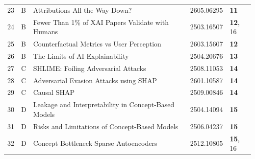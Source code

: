 \begin{longtable}{@{}clllp{\danhmucwch}@{}}
23 & B & Attributions All the Way Down? & 2605.06295 & \textbf{11} \\
24 & B & Fewer Than 1\% of XAI Papers Validate with Humans & 2503.16507 & \textbf{12}, 16 \\
25 & B & Counterfactual Metrics vs User Perception & 2603.15607 & \textbf{12} \\
26 & B & The Limits of AI Explainability & 2504.20676 & \textbf{13} \\
27 & C & SHLIME: Foiling Adversarial Attacks & 2508.11053 & \textbf{14} \\
28 & C & Adversarial Evasion Attacks using SHAP & 2601.10587 & \textbf{14} \\
29 & C & Causal SHAP & 2509.00846 & \textbf{14} \\
30 & D & Leakage and Interpretability in Concept-Based Models & 2504.14094 & \textbf{15} \\
31 & D & Risks and Limitations of Concept-Based Models & 2506.04237 & \textbf{15} \\
32 & D & Concept Bottleneck Sparse Autoencoders & 2512.10805 & \textbf{15}, 16 \\
\end{longtable}
\normalsize
